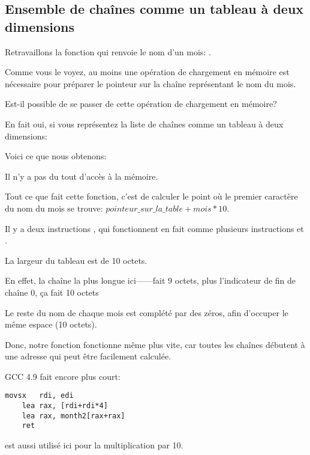 \subsection{Ensemble de chaînes comme un tableau à deux dimensions}

Retravaillons la fonction qui renvoie le nom d'un mois: .

Comme vous le voyez, au moins une opération de chargement en mémoire est nécessaire
pour préparer le pointeur sur la chaîne représentant le nom du mois.

Est-il possible de se passer de cette opération de chargement en mémoire?

En fait oui, si vous représentez la liste de chaînes comme un tableau à deux dimensions:



Voici ce que nous obtenons:



Il n'y a pas du tout d'accès à la mémoire.

Tout ce que fait cette fonction, c'est de calculer le point où le premier caractère
du nom du mois se trouve:
$pointeur\_sur\_la\_table + mois * 10$.

Il y a deux instructions \LEA, qui fonctionnent en fait comme plusieurs instructions
\MUL et \MOV.

La largeur du tableau est de 10 octets.

En effet, la chaîne la plus longue ici------fait 9 octets, plus l'indicateur
de fin de chaîne 0, ça fait 10 octets

Le reste du nom de chaque mois est complété par des zéros, afin d'occuper le même
espace (10 octets).

Donc, notre fonction fonctionne même plus vite, car toutes les chaînes débutent à
une adresse qui peut être facilement calculée.

GCC 4.9 \Optimizing fait encore plus court:

\begin{lstlisting}[caption=GCC 4.9 x64 \Optimizing,style=customasmx86]
	movsx	rdi, edi
	lea	rax, [rdi+rdi*4]
	lea	rax, month2[rax+rax]
	ret
\end{lstlisting}

\LEA est aussi utilisé ici pour la multiplication par 10.

